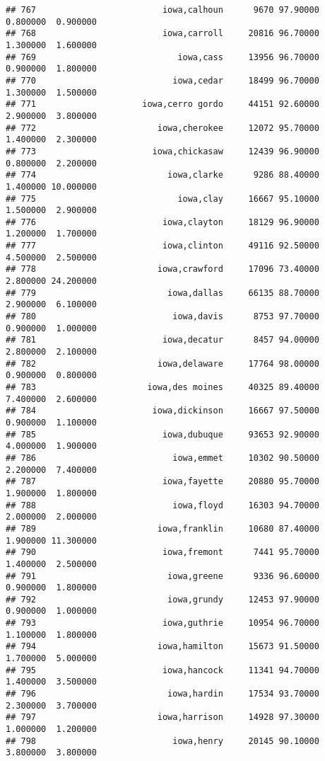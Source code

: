 \documentclass[
]{article}
\begin{document}
\begin{verbatim}
## 767                         iowa,calhoun      9670 97.90000  0.800000  0.900000
## 768                         iowa,carroll     20816 96.70000  1.300000  1.600000
## 769                            iowa,cass     13956 96.70000  0.900000  1.800000
## 770                           iowa,cedar     18499 96.70000  1.300000  1.500000
## 771                     iowa,cerro gordo     44151 92.60000  2.900000  3.800000
## 772                        iowa,cherokee     12072 95.70000  1.400000  2.300000
## 773                       iowa,chickasaw     12439 96.90000  0.800000  2.200000
## 774                          iowa,clarke      9286 88.40000  1.400000 10.000000
## 775                            iowa,clay     16667 95.10000  1.500000  2.900000
## 776                         iowa,clayton     18129 96.90000  1.200000  1.700000
## 777                         iowa,clinton     49116 92.50000  4.500000  2.500000
## 778                        iowa,crawford     17096 73.40000  2.800000 24.200000
## 779                          iowa,dallas     66135 88.70000  2.900000  6.100000
## 780                           iowa,davis      8753 97.70000  0.900000  1.000000
## 781                         iowa,decatur      8457 94.00000  2.800000  2.100000
## 782                        iowa,delaware     17764 98.00000  0.900000  0.800000
## 783                      iowa,des moines     40325 89.40000  7.400000  2.600000
## 784                       iowa,dickinson     16667 97.50000  0.900000  1.100000
## 785                         iowa,dubuque     93653 92.90000  4.000000  1.900000
## 786                           iowa,emmet     10302 90.50000  2.200000  7.400000
## 787                         iowa,fayette     20880 95.70000  1.900000  1.800000
## 788                           iowa,floyd     16303 94.70000  2.000000  2.000000
## 789                        iowa,franklin     10680 87.40000  1.900000 11.300000
## 790                         iowa,fremont      7441 95.70000  1.400000  2.500000
## 791                          iowa,greene      9336 96.60000  0.900000  1.800000
## 792                          iowa,grundy     12453 97.90000  0.900000  1.000000
## 793                         iowa,guthrie     10954 96.70000  1.100000  1.800000
## 794                        iowa,hamilton     15673 91.50000  1.700000  5.000000
## 795                         iowa,hancock     11341 94.70000  1.400000  3.500000
## 796                          iowa,hardin     17534 93.70000  2.300000  3.700000
## 797                        iowa,harrison     14928 97.30000  1.000000  1.200000
## 798                           iowa,henry     20145 90.10000  3.800000  3.800000

\end{verbatim}
\end{document}
